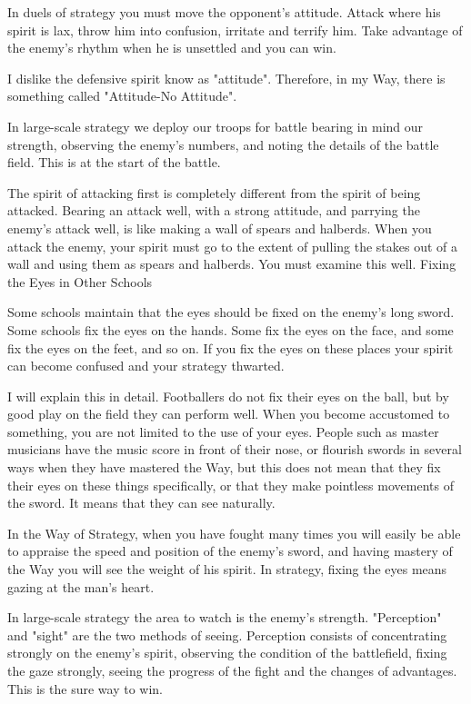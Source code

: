 In duels of strategy you must move the opponent's attitude. Attack where his spirit is lax, throw him into confusion, irritate and terrify him. Take advantage of the enemy's rhythm when he is unsettled and you can win.

I dislike the defensive spirit know as "attitude". Therefore, in my Way, there is something called "Attitude-No Attitude".

In large-scale strategy we deploy our troops for battle bearing in mind our strength, observing the enemy's numbers, and noting the details of the battle field. This is at the start of the battle.

The spirit of attacking first is completely different from the spirit of being attacked. Bearing an attack well, with a strong attitude, and parrying the enemy's attack well, is like making a wall of spears and halberds. When you attack the enemy, your spirit must go to the extent of pulling the stakes out of a wall and using them as spears and halberds. You must examine this well.
Fixing the Eyes in Other Schools

Some schools maintain that the eyes should be fixed on the enemy's long sword. Some schools fix the eyes on the hands. Some fix the eyes on the face, and some fix the eyes on the feet, and so on. If you fix the eyes on these places your spirit can become confused and your strategy thwarted.

I will explain this in detail. Footballers do not fix their eyes on the ball, but by good play on the field they can perform well. When you become accustomed to something, you are not limited to the use of your eyes. People such as master musicians have the music score in front of their nose, or flourish swords in several ways when they have mastered the Way, but this does not mean that they fix their eyes on these things specifically, or that they make pointless movements of the sword. It means that they can see naturally.

In the Way of Strategy, when you have fought many times you will easily be able to appraise the speed and position of the enemy's sword, and having mastery of the Way you will see the weight of his spirit. In strategy, fixing the eyes means gazing at the man's heart.

In large-scale strategy the area to watch is the enemy's strength. "Perception" and "sight" are the two methods of seeing. Perception consists of concentrating strongly on the enemy's spirit, observing the condition of the battlefield, fixing the gaze strongly, seeing the progress of the fight and the changes of advantages. This is the sure way to win.

